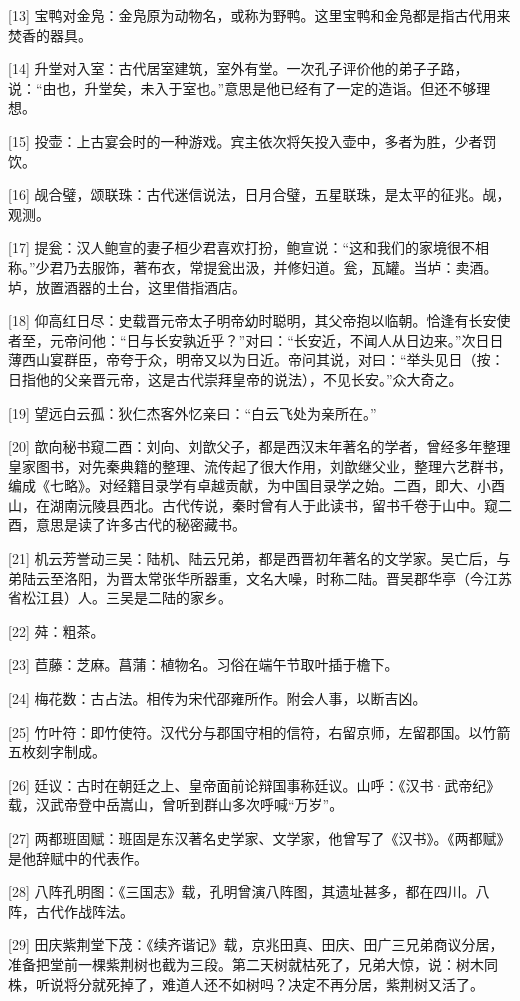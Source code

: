 \documentclass[12pt,UTF8]{ctexbook}
\begin{document}
[13] 宝鸭对金凫：金凫原为动物名，或称为野鸭。这里宝鸭和金凫都是指古代用来焚香的器具。

[14] 升堂对入室：古代居室建筑，室外有堂。一次孔子评价他的弟子子路，说：“由也，升堂矣，未入于室也。”意思是他已经有了一定的造诣。但还不够理想。

[15] 投壶：上古宴会时的一种游戏。宾主依次将矢投入壶中，多者为胜，少者罚饮。

[16] 觇合璧，颂联珠：古代迷信说法，日月合璧，五星联珠，是太平的征兆。觇，观测。

[17] 提瓮：汉人鲍宣的妻子桓少君喜欢打扮，鲍宣说：“这和我们的家境很不相称。”少君乃去服饰，著布衣，常提瓮出汲，并修妇道。瓮，瓦罐。当垆：卖酒。垆，放置酒器的土台，这里借指酒店。

[18] 仰高红日尽：史载晋元帝太子明帝幼时聪明，其父帝抱以临朝。恰逢有长安使者至，元帝问他：“日与长安孰近乎？”对曰：“长安近，不闻人从日边来。”次日日薄西山宴群臣，帝夸于众，明帝又以为日近。帝问其说，对曰：“举头见日（按：日指他的父亲晋元帝，这是古代崇拜皇帝的说法），不见长安。”众大奇之。

[19] 望远白云孤：狄仁杰客外忆亲曰：“白云飞处为亲所在。”

[20] 歆向秘书窥二酉：刘向、刘歆父子，都是西汉末年著名的学者，曾经多年整理皇家图书，对先秦典籍的整理、流传起了很大作用，刘歆继父业，整理六艺群书，编成《七略》。对经籍目录学有卓越贡献，为中国目录学之始。二酉，即大、小酉山，在湖南沅陵县西北。古代传说，秦时曾有人于此读书，留书千卷于山中。窥二酉，意思是读了许多古代的秘密藏书。

[21] 机云芳誉动三吴：陆机、陆云兄弟，都是西晋初年著名的文学家。吴亡后，与弟陆云至洛阳，为晋太常张华所器重，文名大噪，时称二陆。晋吴郡华亭（今江苏省松江县）人。三吴是二陆的家乡。

[22] 荈：粗茶。

[23] 苣藤：芝麻。菖蒲：植物名。习俗在端午节取叶插于檐下。

[24] 梅花数：古占法。相传为宋代邵雍所作。附会人事，以断吉凶。

[25] 竹叶符：即竹使符。汉代分与郡国守相的信符，右留京师，左留郡国。以竹箭五枚刻字制成。

[26] 廷议：古时在朝廷之上、皇帝面前论辩国事称廷议。山呼：《汉书·武帝纪》载，汉武帝登中岳嵩山，曾听到群山多次呼喊“万岁”。

[27] 两都班固赋：班固是东汉著名史学家、文学家，他曾写了《汉书》。《两都赋》是他辞赋中的代表作。

[28] 八阵孔明图：《三国志》载，孔明曾演八阵图，其遗址甚多，都在四川。八阵，古代作战阵法。

[29] 田庆紫荆堂下茂：《续齐谐记》载，京兆田真、田庆、田广三兄弟商议分居，准备把堂前一棵紫荆树也截为三段。第二天树就枯死了，兄弟大惊，说：树木同株，听说将分就死掉了，难道人还不如树吗？决定不再分居，紫荆树又活了。
\end{document}
